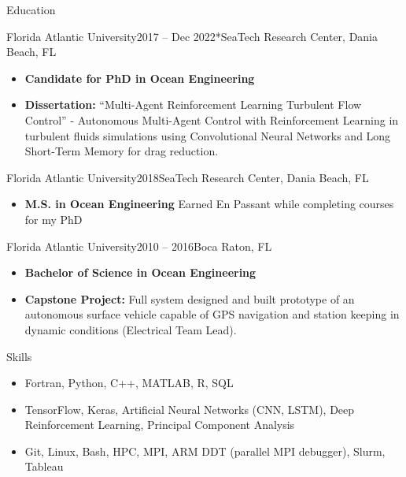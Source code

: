 \documentclass[]{mcdowellcv}
\begin{document}
	\makeheader
	

\begin{cvsection}{Education}
		\begin{cvsubsection}{Florida Atlantic University}{}{2017 -- Dec 2022*}{SeaTech Research Center, Dania Beach, FL}
			\begin{itemize}
				\item \textbf{Candidate for PhD in Ocean Engineering}
				\item \textbf{Dissertation:} ``Multi-Agent Reinforcement Learning Turbulent Flow Control'' - Autonomous Multi-Agent Control with Reinforcement Learning in turbulent fluids simulations using Convolutional Neural Networks and Long Short-Term Memory for drag reduction.
			\end{itemize}
		\end{cvsubsection}
		\begin{cvsubsection}{Florida Atlantic University}{}{2018}{SeaTech Research Center, Dania Beach, FL}
			\begin{itemize}
				\item \textbf{M.S. in Ocean Engineering} Earned En Passant while completing courses for my PhD
			\end{itemize}
		\end{cvsubsection}				
		\begin{cvsubsection}{Florida Atlantic University}{}{2010 -- 2016}{Boca Raton, FL}
			\begin{itemize}
				\item \textbf{Bachelor of Science in Ocean Engineering}
				\item \textbf{Capstone Project:} Full system designed and built prototype of an autonomous surface vehicle capable of GPS navigation and station keeping in dynamic conditions (Electrical Team Lead).
			\end{itemize}
		\end{cvsubsection}
	\end{cvsection}
	
			\begin{cvsection}{Skills}
		\begin{cvsubsection}{}{}{}	
			\begin{itemize}
				\item Fortran, Python, C++, MATLAB, R, SQL
				\item TensorFlow, Keras, Artificial Neural Networks (CNN, LSTM), Deep Reinforcement Learning, Principal Component Analysis
				\item Git, Linux, Bash, HPC, MPI, ARM DDT (parallel MPI debugger), Slurm, Tableau
			\end{itemize}
		\end{cvsubsection}
	\end{cvsection}
	
\end{document}
